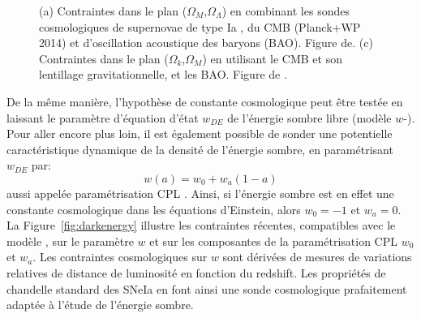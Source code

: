\documentclass[../main/main.tex]{subfiles}
\begin{document}
\begin{figure}[ht]
\centering
{}\hfill
{}
\caption[]{(a) Contraintes dans le plan
  ($\Omega_{M}$,$\Omega_{\Lambda}$) en combinant les sondes
  cosmologiques de supernovae de type Ia \citep[JLA,][]{Betoule2014}, du
  CMB (Planck+WP 2014) et d'oscillation
  acoustique des baryons (BAO). Figure de\citet{Betoule2014}. (c)
  Contraintes dans le plan ($\Omega_{k}$,$\Omega_{M}$) en utilisant le
  CMB et son lentillage gravitationnelle, et les BAO. Figure de \citet{Planckparams2018}.}
\label{fig:flatcontrainte}
\end{figure}

De la même manière, l'hypothèse de constante cosmologique peut être
testée en laissant le paramètre d'équation d'état $w_{DE}$ de l'énergie
sombre libre (modèle $w$-\lcdm). Pour aller encore plus loin, il est
également possible de sonder une potentielle caractéristique dynamique
de la densité de l'énergie sombre, en paramétrisant $w_{DE}$ par:
\begin{equation}
  \label{eq:wCPL}
  w(a)=w_{0}+w_{a}(1-a)
\end{equation}
aussi appelée paramétrisation CPL \citep{CPL2001,Linder2003}. Ainsi, si
l'énergie sombre est en effet une constante cosmologique dans les
équations d'Einstein, alors $w_{0}=-1$ et $w_{a}=0$. La
Figure~\ref{fig:darkenergy} illustre les contraintes récentes,
compatibles avec le modèle \lcdm, sur le
paramètre $w$ et sur les composantes de la paramétrisation CPL $w_{0}$
et $w_{a}$.
Les contraintes cosmologiques sur $w$
sont dérivées de mesures de variations relatives de distance de
luminosité en fonction du redshift. Les propriétés de chandelle standard
des SNeIa en font ainsi une sonde cosmologique prafaitement adaptée à l'étude
de l'énergie sombre.
\end{document}
